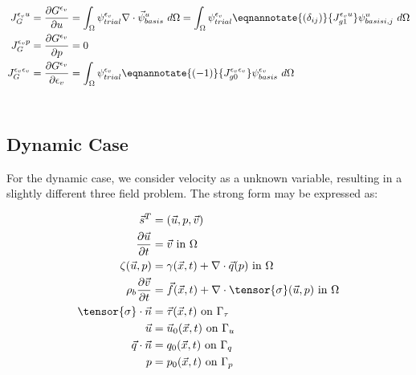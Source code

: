 \begin{align}
J_G^{\epsilon_{v}u} &= \frac{\partial G^{\epsilon_{v}}}{\partial u} =
\int_{\Omega} \psi_{trial}^{\epsilon_{v}} \nabla \cdot \vec{\psi}_{basis}^u \ d\Omega = \int_{\Omega}
\psi_{trial}^{\epsilon_{v}}
\eqnannotate{\left(\delta_{ij}\right)}{J_{g1}^{\epsilon_{v}u}}
\psi_{basis
i,j}^u \
d\Omega\\
%
J_G^{\epsilon_{v}p} &= \frac{\partial G^{\epsilon_{v}}}{\partial p} = 0 \\
J_G^{\epsilon_{v} \epsilon_{v}} &= \frac{\partial G^{\epsilon_{v}}}{\partial
\epsilon_{v}} = \int_{\Omega} \psi_{trial}^{\epsilon_{v}}
\eqnannotate{\left(-1\right)}{J_{g0}^{\epsilon_{v}\epsilon_{v}}}
\psi_{basis}^{\epsilon_{v}} \ d\Omega
\end{align} \\


\subsection{Dynamic Case}

For the dynamic case, we consider velocity as a unknown variable, resulting in a slightly different
three field problem. The strong form may be expressed as:

\begin{align}
\vec{s}^{T} &= \left(\vec{u}, p, \vec{v}\right) \\
\frac{\partial \vec{u}}{\partial t} &= \vec{v} \text{ in } \Omega \\
\zeta(\vec{u},p) &= \gamma(\vec{x},t) + \nabla \cdot \vec{q}(p) \text{ in } \Omega \\
\rho_{b} \frac{\partial \vec{v}}{\partial t} &= \vec{f}(\vec{x},t) + \nabla \cdot \tensor{\sigma}(\vec{u},p) \text{ in } \Omega \\
\tensor{\sigma} \cdot \vec{n} &= \vec{\tau}(\vec{x},t) \text{ on } \Gamma_{\tau} \\
\vec{u} &= \vec{u}_{0}(\vec{x}, t) \text{ on } \Gamma_{u} \\
\vec{q} \cdot \vec{n} &= q_{0}(\vec{x}, t) \text{ on } \Gamma_{q} \\
p &= p_{0}(\vec{x},t) \text{ on } \Gamma_{p}
\end{align}



